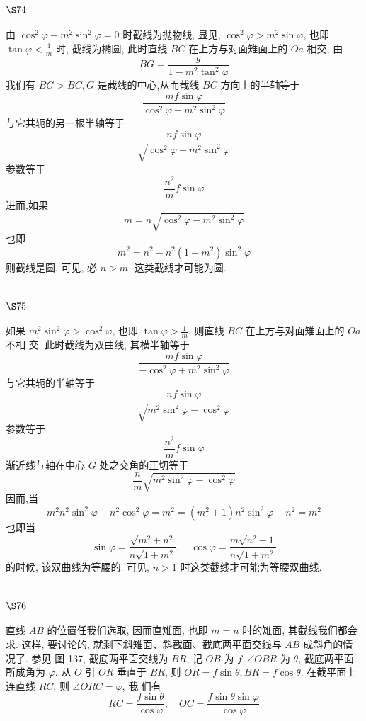 \section{$\S 74$}

由 $\cos ^{2} \varphi-m^{2} \sin ^{2} \varphi=0$ 时截线为抛物线, 显见, $\cos ^{2} \varphi>m^{2} \sin \varphi$, 也即 $\tan \varphi<\frac{1}{m}$ 时, 截线为椭圆, 此时直线 $B C$ 在上方与对面雉面上的 $O a$ 相交, 由 
\[
B G=\frac{g}{1-m^{2} \tan ^{2} \varphi}
\]
我们有 $B G>B C, G$ 是截线的中心,从而截线 $B C$ 方向上的半轴等于
\[
\frac{m f \sin \varphi}{\cos ^{2} \varphi-m^{2} \sin ^{2} \varphi}
\]
与它共轭的另一根半轴等于
\[
\frac{n f \sin \varphi}{\sqrt{\cos ^{2} \varphi-m^{2} \sin ^{2} \varphi}}
\]
参数等于
\[
\frac{n^{2}}{m} f \sin \varphi
\]
进而,如果
\[
m=n \sqrt{\cos ^{2} \varphi-m^{2} \sin ^{2} \varphi}
\]
也即
\[
m^{2}=n^{2}-n^{2}\left(1+m^{2}\right) \sin ^{2} \varphi
\]
则截线是圆. 可见, 必 $n>m$, 这类截线才可能为圆.

\section{$\S 75$}

如果 $m^{2} \sin ^{2} \varphi>\cos ^{2} \varphi$, 也即 $\tan \varphi>\frac{1}{m}$, 则直线 $B C$ 在上方与对面雉面上的 $O a$ 不相 交. 此时截线为双曲线, 其横半轴等于
\[
\frac{m f \sin \varphi}{-\cos ^{2} \varphi+m^{2} \sin ^{2} \varphi}
\]
与它共轭的半轴等于
\[
\frac{n f \sin \varphi}{\sqrt{m^{2} \sin ^{2} \varphi-\cos ^{2} \varphi}}
\]
参数等于
\[
\frac{n^{2}}{m} f \sin \varphi
\]
渐近线与轴在中心 $G$ 处之交角的正切等于
\[
\frac{n}{m} \sqrt{m^{2} \sin ^{2} \varphi-\cos ^{2} \varphi}
\]
因而,当
\[
m^{2} n^{2} \sin ^{2} \varphi-n^{2} \cos ^{2} \varphi=m^{2}=\left(m^{2}+1\right) n^{2} \sin ^{2} \varphi-n^{2}=m^{2}
\]
也即当
\[
\sin \varphi=\frac{\sqrt{m^{2}+n^{2}}}{n \sqrt{1+m^{2}}}, \quad \cos \varphi=\frac{m \sqrt{n^{2}-1}}{n \sqrt{1+m^{2}}}
\]
的时候, 该双曲线为等腰的. 可见, $n>1$ 时这类截线才可能为等腰双曲线. 

\section{$\S 76$}

直线 $A B$ 的位置任我们选取, 因而直雉面, 也即 $m=n$ 时的雉面, 其截线我们都会求. 这样, 要讨论的, 就剩下斜雉面、斜截面、截底两平面交线与 $A B$ 成斜角的情况了. 参见 图 137, 截底两平面交线为 $B R$, 记 $O B$ 为 $f, \angle O B R$ 为 $\theta$, 截底两平面所成角为 $\varphi$. 从 $O$ 引 $O R$ 垂直于 $B R$, 则 $O R=f \sin \theta, B R=f \cos \theta$. 在截平面上连直线 $R C$, 则 $\angle O R C=\varphi$, 我 们有
\[
R C=\frac{f \sin \theta}{\cos \varphi}, \quad O C=\frac{f \sin \theta \sin \varphi}{\cos \varphi}
\]

